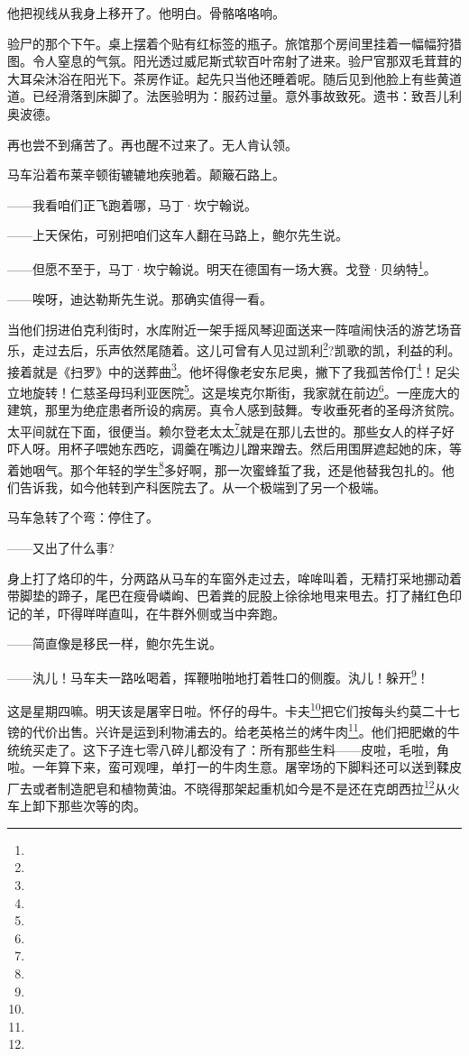 \par 他把视线从我身上移开了。他明白。骨骼咯咯响。
\par 验尸的那个下午。桌上摆着个贴有红标签的瓶子。旅馆那个房间里挂着一幅幅狩猎图。令人窒息的气氛。阳光透过威尼斯式软百叶帘射了进来。验尸官那双毛茸茸的大耳朵沐浴在阳光下。茶房作证。起先只当他还睡着呢。随后见到他脸上有些黄道道。已经滑落到床脚了。法医验明为：服药过量。意外事故致死。遗书：致吾儿利奥波德。
\par 再也尝不到痛苦了。再也醒不过来了。无人肯认领。
\par 马车沿着布莱辛顿街辘辘地疾驰着。颠簸石路上。
\par ——我看咱们正飞跑着哪，马丁·坎宁翰说。
\par ——上天保佑，可别把咱们这车人翻在马路上，鲍尔先生说。
\par ——但愿不至于，马丁·坎宁翰说。明天在德国有一场大赛。戈登·贝纳特\footnote{}。
\par ——唉呀，迪达勒斯先生说。那确实值得一看。
\par 当他们拐进伯克利街时，水库附近一架手摇风琴迎面送来一阵喧闹快活的游艺场音乐，走过去后，乐声依然尾随着。这儿可曾有人见过凯利\footnote{}?凯歌的凯，利益的利。接着就是《扫罗》中的送葬曲\footnote{}。他坏得像老安东尼奥，撇下了我孤苦伶仃\footnote{}！足尖立地旋转！仁慈圣母玛利亚医院\footnote{}。这是埃克尔斯街，我家就在前边\footnote{}。一座庞大的建筑，那里为绝症患者所设的病房。真令人感到鼓舞。专收垂死者的圣母济贫院。太平间就在下面，很便当。赖尔登老太太\footnote{}就是在那儿去世的。那些女人的样子好吓人呀。用杯子喂她东西吃，调羹在嘴边儿蹭来蹭去。然后用围屏遮起她的床，等着她咽气。那个年轻的学生\footnote{}多好啊，那一次蜜蜂蜇了我，还是他替我包扎的。他们告诉我，如今他转到产科医院去了。从一个极端到了另一个极端。
\par 马车急转了个弯：停住了。
\par ——又出了什么事?
\par 身上打了烙印的牛，分两路从马车的车窗外走过去，哞哞叫着，无精打采地挪动着带脚垫的蹄子，尾巴在瘦骨嶙峋、巴着粪的屁股上徐徐地甩来甩去。打了赭红色印记的羊，吓得咩咩直叫，在牛群外侧或当中奔跑。
\par ——简直像是移民一样，鲍尔先生说。
\par ——汍儿！马车夫一路吆喝着，挥鞭啪啪地打着牲口的侧腹。汍儿！躲开\footnote{}！
\par 这是星期四嘛。明天该是屠宰日啦。怀仔的母牛。卡夫\footnote{}把它们按每头约莫二十七镑的代价出售。兴许是运到利物浦去的。给老英格兰的烤牛肉\footnote{}。他们把肥嫩的牛统统买走了。这下子连七零八碎儿都没有了：所有那些生料——皮啦，毛啦，角啦。一年算下来，蛮可观哩，单打一的牛肉生意。屠宰场的下脚料还可以送到鞣皮厂去或者制造肥皂和植物黄油。不晓得那架起重机如今是不是还在克朗西拉\footnote{}从火车上卸下那些次等的肉。
